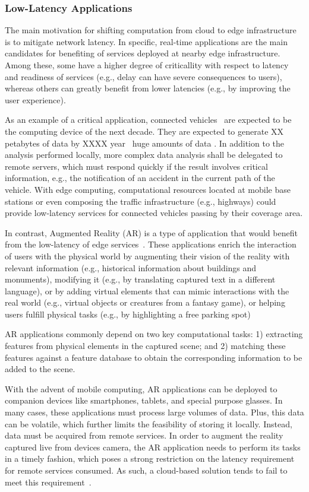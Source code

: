 \subsubsection{Low-Latency Applications}

The main motivation for shifting computation from cloud to edge infrastructure is to mitigate network latency. In specific, real-time applications are the main candidates for benefiting of services deployed at nearby edge infrastructure. Among these, some have a higher degree of criticallity with respect to latency and readiness of services (e.g., delay can have severe consequences to users), whereas others can greatly benefit from lower latencies (e.g., by improving the user experience).

As an example of a critical application, connected vehicles~\cite{} are expected to be the computing device of the next decade. They are expected to generate XX petabytes of data by XXXX year~\cite{connectedCars} huge amounts of data %
. In addition to the analysis performed locally, more complex data analysis shall be delegated to remote servers, which must respond quickly if the result involves critical information, e.g., the notification of an accident in the current path of the vehicle. With edge computing, computational resources located at mobile base stations or even composing the traffic infrastructure (e.g., highways) could provide low-latency services for connected vehicles passing by their coverage area.

In contrast, Augmented Reality (AR) is a type of application that would benefit from the low-latency of edge services~\cite{hu2015mobile}. These applications enrich the interaction of users with the physical
world by augmenting their vision of the reality with relevant information (e.g., historical information about buildings and monuments), modifying it (e.g., by translating captured text in a different language), or by adding virtual elements that can mimic interactions with the real world (e.g., virtual objects or creatures
from a fantasy game), or helping users fulfill physical tasks (e.g., by highlighting a free parking spot) 

AR applications commonly depend on two key computational tasks: 1) extracting features from physical elements in the captured scene; and 2) matching these features against a feature database to obtain the corresponding information to be added to the scene. 

With the advent of mobile computing, AR applications can be deployed to companion devices like smartphones, tablets, and special purpose glasses. In many cases, these applications must process large volumes of data. Plus, this data can be volatile, which further limits the feasibility of storing it locally. Instead, data must be acquired from remote services. In order to augment the reality captured live from devices camera, the AR application needs to perform its tasks in a timely fashion, which poses a strong restriction on the latency requirement for remote services consumed. As such, a cloud-based solution tends to fail to meet this requirement~\cite{ServerlessEdgeESOCC17}. 

